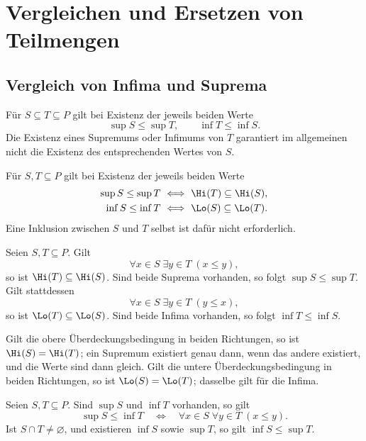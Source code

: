 \chapter{Vergleichen und Ersetzen von Teilmengen}
\label{b13guide:ch:comparison}

\section{Vergleich von Infima und Suprema}

\begin{theorem}
\label{b13guide:thm:monotone}
Für $S\subseteq T\subseteq P$ gilt bei Existenz der jeweils
beiden Werte
\[
 \sup S\leq\sup T,\qquad \inf T\leq\inf S.
\]
Die Existenz eines Supremums oder Infimums von $T$ garantiert
im allgemeinen nicht die Existenz des entsprechenden Wertes von $S$.
\end{theorem}


\begin{theorem}
\label{b13guide:thm:exact-comparison}
Für $S,T\subseteq P$ gilt bei Existenz der jeweils beiden Werte
\[
\begin{aligned}
 \sup S\leq\sup T&\ \Longleftrightarrow\ \Hi(T)\subseteq\Hi(S),\\
 \inf S\leq\inf T&\ \Longleftrightarrow\ \Lo(S)\subseteq\Lo(T).
\end{aligned}
\]
Eine Inklusion zwischen $S$ und $T$ selbst ist dafür nicht erforderlich.
\end{theorem}

\begin{theorem}
\label{b13guide:thm:domination}
Seien $S,T\subseteq P$. Gilt
\[
 \forall x\in S\;\exists y\in T\;(x\leq y),
\]
so ist $\Hi(T)\subseteq\Hi(S)$. Sind beide Suprema vorhanden,
so folgt $\sup S\leq\sup T$.
Gilt stattdessen
\[
 \forall x\in S\;\exists y\in T\;(y\leq x),
\]
so ist $\Lo(T)\subseteq\Lo(S)$. Sind beide Infima vorhanden,
so folgt $\inf T\leq\inf S$.

Gilt die obere Überdeckungsbedingung in beiden Richtungen, so ist
$\Hi(S)=\Hi(T)$; ein Supremum existiert genau dann, wenn das
andere existiert, und die Werte sind dann gleich. Gilt die untere
Überdeckungsbedingung in beiden Richtungen, so ist
$\Lo(S)=\Lo(T)$; dasselbe gilt für die Infima.

\end{theorem}

\begin{theorem}
\label{b13guide:thm:separation}
Seien $S,T\subseteq P$. Sind $\sup S$ und $\inf T$ vorhanden, so gilt
\[
 \sup S\leq\inf T
 \quad\Longleftrightarrow\quad
 \forall x\in S\;\forall y\in T\;(x\leq y).
\]
Ist $S\cap T\ne\varnothing$, und existieren $\inf S$ sowie $\sup T$,
so gilt $\inf S\leq\sup T$.
\end{theorem}

